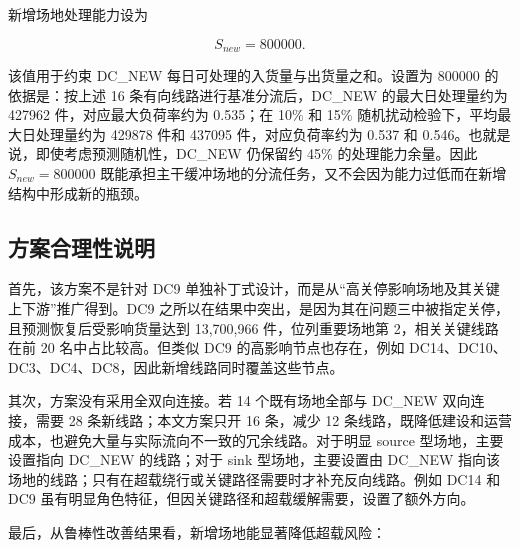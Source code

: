 \documentclass[UTF8,zihao=-4,a4paper,fontset=fandol]{ctexart}
\begin{document}
新增场地处理能力设为



\begin{equation}
S_{new}=800000.
\end{equation}



该值用于约束 DC\_NEW 每日可处理的入货量与出货量之和。设置为 800000 的依据是：按上述 16 条有向线路进行基准分流后，DC\_NEW 的最大日处理量约为 427962 件，对应最大负荷率约为 0.535；在 10\% 和 15\% 随机扰动检验下，平均最大日处理量约为 429878 件和 437095 件，对应负荷率约为 0.537 和 0.546。也就是说，即使考虑预测随机性，DC\_NEW 仍保留约 45\% 的处理能力余量。因此 $S_{new}=800000$ 既能承担主干缓冲场地的分流任务，又不会因为能力过低而在新增结构中形成新的瓶颈。



\subsection{方案合理性说明}



首先，该方案不是针对 DC9 单独补丁式设计，而是从“高关停影响场地及其关键上下游”推广得到。DC9 之所以在结果中突出，是因为其在问题三中被指定关停，且预测恢复后受影响货量达到 13,700,966 件，位列重要场地第 2，相关关键线路在前 20 名中占比较高。但类似 DC9 的高影响节点也存在，例如 DC14、DC10、DC3、DC4、DC8，因此新增线路同时覆盖这些节点。



其次，方案没有采用全双向连接。若 14 个既有场地全部与 DC\_NEW 双向连接，需要 28 条新线路；本文方案只开 16 条，减少 12 条线路，既降低建设和运营成本，也避免大量与实际流向不一致的冗余线路。对于明显 source 型场地，主要设置指向 DC\_NEW 的线路；对于 sink 型场地，主要设置由 DC\_NEW 指向该场地的线路；只有在超载绕行或关键路径需要时才补充反向线路。例如 DC14 和 DC9 虽有明显角色特征，但因关键路径和超载缓解需要，设置了额外方向。



最后，从鲁棒性改善结果看，新增场地能显著降低超载风险：




\begin{table}[H]
  \centering
  \caption{问题四新增场地鲁棒性改善结果}
  \label{tab:auto-16}
\end{table}
\end{document}
